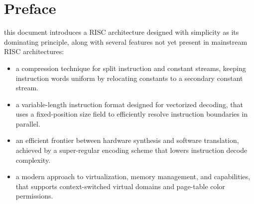 \begin{center}
\begin{minipage}[t]{0.48\linewidth}
\end{minipage}
\end{center}

\cleardoublepage
{}
\setcounter{page}{1}
\dominitoc
\tableofcontents

\pagestyle{headings}
\chapter*{Preface}

this document introduces a RISC architecture designed with simplicity
as its dominating principle, along with several features not yet present
in mainstream RISC architectures:

\begin{itemize}[itemsep=0pt]
  \item a compression technique for split instruction and constant streams,
        keeping instruction words uniform by relocating constants to a
        secondary constant stream.
  \item a variable-length instruction format designed for vectorized decoding,
        that uses a fixed-position size field to efficiently resolve
        instruction boundaries in parallel.
  \item an efficient frontier between hardware synthesis and software
        translation, achieved by a super-regular encoding scheme that lowers
        instruction decode complexity.
  \item a modern approach to virtualization, memory management, and
        capabilities, that supports context-switched virtual domains and
        page-table color permissions.
\end{itemize}

